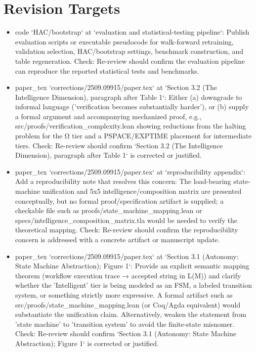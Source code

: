 \documentclass[11pt]{article}
\begin{document}
\section*{Revision Targets}
\begin{itemize}[leftmargin=*]
  \item [open] code `HAC/bootstrap` at `evaluation and statistical-testing pipeline`: Publish evaluation scripts or executable pseudocode for walk-forward retraining, validation selection, HAC/bootstrap settings, benchmark construction, and table regeneration. Check: Re-review should confirm the evaluation pipeline can reproduce the reported statistical tests and benchmarks.
  \item [open] paper\_tex `corrections/2509.09915/paper.tex` at `Section 3.2 (The Intelligence Dimension), paragraph after Table 1`: Either (a) downgrade to informal language ('verification becomes substantially harder'), or (b) supply a formal argument and accompanying mechanized proof, e.g., src/proofs/verification\_complexity.lean showing reductions from the halting problem for the Ω tier and a PSPACE/EXPTIME placement for intermediate tiers. Check: Re-review should confirm `Section 3.2 (The Intelligence Dimension), paragraph after Table 1` is corrected or justified.
  \item [open] paper\_tex `corrections/2509.09915/paper.tex` at `reproducibility appendix`: Add a reproducibility note that resolves this concern: The load-bearing state-machine unification and 5x5 intelligence/composition matrix are presented conceptually, but no formal proof/specification artifact is supplied; a checkable file such as proofs/state\_machine\_mapping.lean or specs/intelligence\_composition\_matrix.tla would be needed to verify the theoretical mapping. Check: Re-review should confirm the reproducibility concern is addressed with a concrete artifact or manuscript update.
  \item [open] paper\_tex `corrections/2509.09915/paper.tex` at `Section 3.1 (Autonomy: State Machine Abstraction); Figure 1`: Provide an explicit semantic mapping theorem (workflow execution trace → accepted string in L(M)) and clarify whether the 'Intelligent' tier is being modeled as an FSM, a labeled transition system, or something strictly more expressive. A formal artifact such as src/proofs/state\_machine\_mapping.lean (or Coq/Agda equivalent) would substantiate the unification claim. Alternatively, weaken the statement from 'state machine' to 'transition system' to avoid the finite-state misnomer. Check: Re-review should confirm `Section 3.1 (Autonomy: State Machine Abstraction); Figure 1` is corrected or justified.

\end{itemize}
\end{document}
